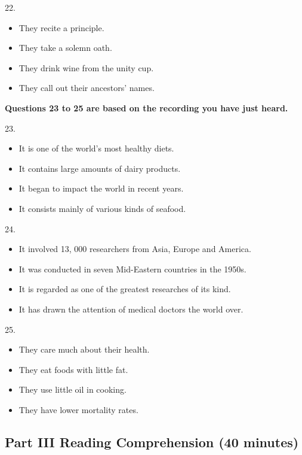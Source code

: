\documentclass[UTF8,11pt]{ctexart}
\begin{document}
22.


\begin{itemize}[leftmargin=2em,itemsep=.2em,topsep=.4em]\item[A.] They recite a principle.
\item[B.] They take a solemn oath.
\item[C.] They drink wine from the unity cup.
\item[D.] They call out their ancestors’ names.
\end{itemize}

\textbf{Questions 23 to 25 are based on the recording you have just heard.}


23.


\begin{itemize}[leftmargin=2em,itemsep=.2em,topsep=.4em]\item[A.] It is one of the world’s most healthy diets.
\item[B.] It contains large amounts of dairy products.
\item[C.] It began to impact the world in recent years.
\item[D.] It consists mainly of various kinds of seafood.
\end{itemize}

24.


\begin{itemize}[leftmargin=2em,itemsep=.2em,topsep=.4em]\item[A.] It involved 13, 000 researchers from Asia, Europe and America.
\item[B.] It was conducted in seven Mid-Eastern countries in the 1950s.
\item[C.] It is regarded as one of the greatest researches of its kind.
\item[D.] It has drawn the attention of medical doctors the world over.
\end{itemize}

25.


\begin{itemize}[leftmargin=2em,itemsep=.2em,topsep=.4em]\item[A.] They care much about their health.
\item[B.] They eat foods with little fat.
\item[C.] They use little oil in cooking.
\item[D.] They have lower mortality rates.
\end{itemize}

\subsection*{\textbf{Part III} \textbf{Reading Comprehension} \textbf{(40 minutes)}}
\end{document}
